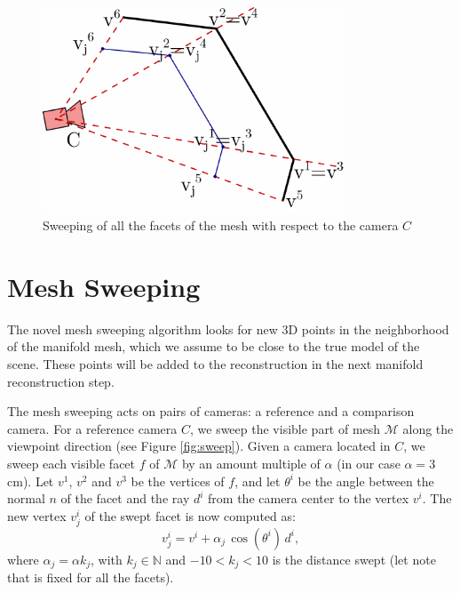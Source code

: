 \begin{figure}[tp]
  \centering
  \includegraphics[width=0.8\textwidth]{./img/ch-sweep/sweepMulti.pdf}
  \caption{Sweeping of all the facets of the mesh with respect to the camera $C$}
  \label{fig:sweepMulti}
\end{figure}


 

\section{Mesh Sweeping}
\label{sec:sweep}
The novel mesh sweeping algorithm looks for new 3D points in the neighborhood of the manifold mesh, which we assume to be close to the true model of the scene.
These points will be added to the reconstruction in the next manifold reconstruction step.

The mesh sweeping acts on pairs of cameras: a reference  and a comparison camera. 
For a reference camera $C$, we sweep the visible part of mesh $\mathcal{M}$ along the viewpoint direction (see Figure \ref{fig:sweep}). 
Given a camera located in $C$, we sweep each visible facet $f$ of $\mathcal{M}$ by an amount multiple of $\alpha$ (in our case $\alpha = 3$cm).
Let $v^1$, $v^2$ and $v^3$ be the vertices of $f$, and let $\theta^i$ be the angle between the normal $n$ of the facet and the ray $d^i$ from the camera center to the vertex $v^i$. 
The new vertex $v_j^i$ of the swept facet is now computed as:
\begin{equation}
v_j^i = v^i + \alpha_j \, \cos (\theta^i) \, d^i,
\end{equation}
where $\alpha_j = \alpha  k_j$, with $k_j \in \mathbb{N}$ and $-10< k_j <10$ is the distance swept (let note that is fixed for all the facets).

